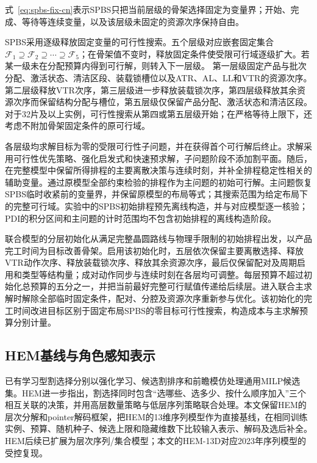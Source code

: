 \documentclass[final,5p,times,twocolumn]{elsarticle}
\begin{document}
式~\eqref{eq:spbs-fix-cn}表示SPBS只把当前层级的骨架选择固定为变量界；开始、完成、等待等连续变量，以及该层级未固定的资源次序保持自由。

SPBS采用逐级释放固定变量的可行性搜索。五个层级对应嵌套固定集合$\mathcal F_1\supseteq\mathcal F_2\supseteq\cdots\supseteq\mathcal F_5$；在骨架值不变时，释放固定条件使受限可行域逐级扩大。若某一级未在分配预算内得到可行解，则转入下一层级。
第一层级固定产品与批次分配、激活状态、清洁区段、装载锁槽位以及ATR、AL、LL和VTR的资源次序。第二层级释放VTR次序，第三层级进一步释放装载锁次序，第四层级释放其余资源次序而保留结构分配与槽位，第五层级仅保留产品分配、激活状态和清洁区段。对于32片及以上实例，可行性搜索从第四或第五层级开始；在严格等待上限下，还考虑不附加骨架固定条件的原可行域。

各层级均求解目标为零的受限可行性子问题，并在获得首个可行解后终止。求解采用可行性优先策略、强化启发式和快速预求解，子问题阶段不添加割平面。随后，在完整模型中保留所得排程的主要离散决策与连续时刻，并补全排程稳定性相关的辅助变量。通过原模型全部约束检验的排程作为主问题的初始可行解。主问题恢复SPBS临时收紧前的变量界，并保留原模型的布局等式；其搜索范围为给定布局下的完整可行域。实验中的SPBS初始排程预先离线构造，并与对应模型逐一核验；PDI的积分区间和主问题的计时范围均不包含初始排程的离线构造阶段。

联合模型的分层初始化从满足完整晶圆路线与物理手限制的初始排程出发，以产品完工时间为目标改善骨架。启用该初始化时，五层依次保留主要离散选择、释放VTR动作次序、释放装载锁次序、释放其余资源次序，最后仅保留配对及周期启用和类型等结构量；成对动作同步与连续时刻在各层均可调整。每层预算不超过初始化总预算的五分之一，并把当前最好完整可行赋值传递给后续层。进入联合主求解时解除全部临时固定条件，配对、分腔及资源次序重新参与优化。该初始化的完工时间改进目标区别于固定布局SPBS的零目标可行性搜索，构造成本与主求解预算分别计量。

\subsection{HEM基线与角色感知表示}

已有学习型割选择分别以强化学习、候选割排序和前瞻模仿处理通用MILP候选集\citep{tang2020cut,huang2022cutranking,paulus2022looking}。HEM进一步指出，割选择同时包含“选哪些、选多少、按什么顺序加入”三个相互关联的决策，并用高层数量策略与低层序列策略联合处理\citep{wang2023hem}。本文保留HEM的层次分解和pointer解码框架，把HEM的13维序列模型作为直接基线，在相同训练实例、预算、随机种子、候选上限和隐藏维数下比较输入表示、解码及选后补全。HEM后续已扩展为层次序列/集合模型\citep{wang2024hemset}；本文的HEM-13D对应2023年序列模型的受控复现。
\end{document}
